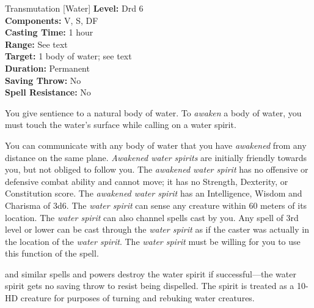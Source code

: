 {Transmutation [Water]}
{
	\textbf{Level:}
	Drd 6\\
	\textbf{Components:}
	V, S, DF\\
	\textbf{Casting Time:}
	1 hour\\
	\textbf{Range:}
	See text\\
	\textbf{Target:}
	1 body of water; see text\\
	\textbf{Duration:}
	Permanent\\
	\textbf{Saving Throw:}
	No\\
	\textbf{Spell Resistance:}
	No\\
}
{
	You give sentience to a natural body of water. To \emph{awaken} a body of water, you must touch the water's surface while calling on a water spirit.

	You can communicate with any body of water that you have \emph{awakened} from any distance on the same plane. \emph{Awakened water spirits} are initially friendly towards you, but not obliged to follow you. The \emph{awakened water spirit} has no offensive or defensive combat ability and cannot move; it has no Strength, Dexterity, or Constitution score. The \emph{awakened water spirit} has an Intelligence, Wisdom and Charisma of 3d6. The \emph{water spirit} can sense any creature within 60 meters of its location. The \emph{water spirit} can also channel spells cast by you. Any spell of 3rd level or lower can be cast through the \emph{water spirit} as if the caster was actually in the location of the \emph{water spirit}. The \emph{water spirit} must be willing for you to use this function of the spell.

	 and similar spells and powers destroy the water spirit if successful---the water spirit gets no saving throw to resist being dispelled. The spirit is treated as a 10-HD creature for purposes of turning and rebuking water creatures.
}